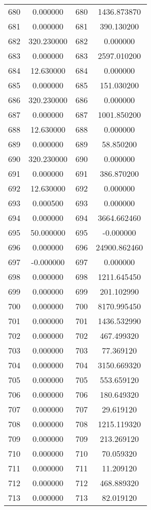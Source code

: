 \documentclass[12pt]{article}
\begin{document}
\begin{longtable}{@{}cccc@{}}
680 & 0.000000 & 680 & 1436.873870 \\
681 & 0.000000 & 681 & 390.130200 \\
682 & 320.230000 & 682 & 0.000000 \\
683 & 0.000000 & 683 & 2597.010200 \\
684 & 12.630000 & 684 & 0.000000 \\
685 & 0.000000 & 685 & 151.030200 \\
686 & 320.230000 & 686 & 0.000000 \\
687 & 0.000000 & 687 & 1001.850200 \\
688 & 12.630000 & 688 & 0.000000 \\
689 & 0.000000 & 689 & 58.850200 \\
690 & 320.230000 & 690 & 0.000000 \\
691 & 0.000000 & 691 & 386.870200 \\
692 & 12.630000 & 692 & 0.000000 \\
693 & 0.000500 & 693 & 0.000000 \\
694 & 0.000000 & 694 & 3664.662460 \\
695 & 50.000000 & 695 & -0.000000 \\
696 & 0.000000 & 696 & 24900.862460 \\
697 & -0.000000 & 697 & 0.000000 \\
698 & 0.000000 & 698 & 1211.645450 \\
699 & 0.000000 & 699 & 201.102990 \\
700 & 0.000000 & 700 & 8170.995450 \\
701 & 0.000000 & 701 & 1436.532990 \\
702 & 0.000000 & 702 & 467.499320 \\
703 & 0.000000 & 703 & 77.369120 \\
704 & 0.000000 & 704 & 3150.669320 \\
705 & 0.000000 & 705 & 553.659120 \\
706 & 0.000000 & 706 & 180.649320 \\
707 & 0.000000 & 707 & 29.619120 \\
708 & 0.000000 & 708 & 1215.119320 \\
709 & 0.000000 & 709 & 213.269120 \\
710 & 0.000000 & 710 & 70.059320 \\
711 & 0.000000 & 711 & 11.209120 \\
712 & 0.000000 & 712 & 468.889320 \\
713 & 0.000000 & 713 & 82.019120 \\

\end{longtable}
\end{document}

